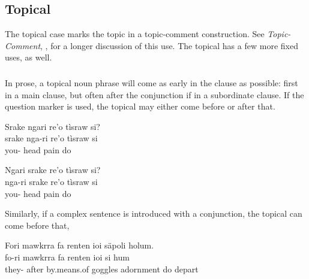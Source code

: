 \subsection{Topical} The topical case marks the topic in a
topic-comment construction.  See \textit{Topic-Comment},
, for a longer discussion of this use.
The topical has a few more fixed uses, as well.

\subsubsection{} \label{syn!topical!word-order}
In prose, a topical noun phrase will come as early in the clause as
possible: first in a main clause, but often after the conjunction if
in a subordinate clause.  If the question marker  is used,
the topical may either come before or after that.

  \begin{interlin}
  \glll Srake ngari re'o tìsraw si? \\
     srake nga-ri re'o tìsraw si \\
      you- head pain do \\
  \end{interlin}

  \begin{interlin}
  \glll Ngari srake re'o tìsraw si? \\
     nga-ri srake re'o tìsraw si \\
     you-  head pain do \\
  \end{interlin}

\noindent Similarly, if a complex sentence is introduced with a
conjunction, the topical can come before that,

\begin{interlin}
\glll Fori mawkrra fa renten ioi säpoli holum. \\
      fo-ri mawkrra fa renten ioi si hum \\
      they- after by.means.of goggles adornment do depart\\
\end{interlin}


